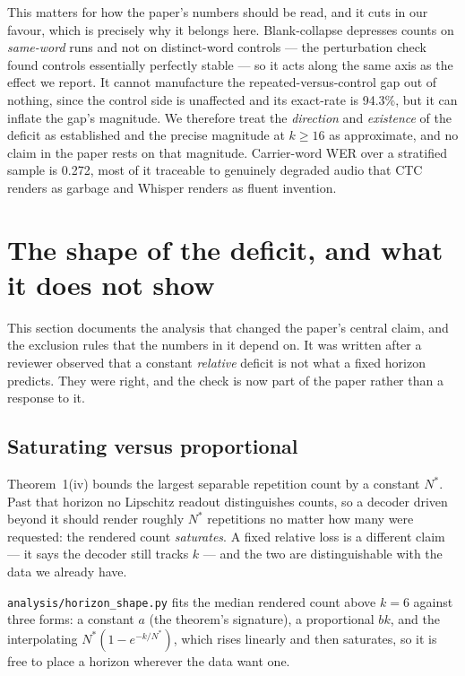 \documentclass[11pt]{article}
\begin{document}
This matters for how the paper's numbers should be read, and it cuts in our
favour, which is precisely why it belongs here. Blank-collapse depresses counts
on \emph{same-word} runs and not on distinct-word controls --- the perturbation
check found controls essentially perfectly stable --- so it acts along the same
axis as the effect we report. It cannot manufacture the repeated-versus-control
gap out of nothing, since the control side is unaffected and its exact-rate is
94.3\%, but it can inflate the gap's magnitude. We therefore treat the
\emph{direction} and \emph{existence} of the deficit as established and the
precise magnitude at $k\ge16$ as approximate, and no claim in the paper rests on
that magnitude. Carrier-word WER over a stratified sample is 0.272, most of it
traceable to genuinely degraded audio that CTC renders as garbage and Whisper
renders as fluent invention.


\section{The shape of the deficit, and what it does not show}
\label{sec:s10}

This section documents the analysis that changed the paper's central claim, and
the exclusion rules that the numbers in it depend on. It was written after a
reviewer observed that a constant \emph{relative} deficit is not what a fixed
horizon predicts. They were right, and the check is now part of the paper rather
than a response to it.

\subsection{Saturating versus proportional}

Theorem~1(iv) bounds the largest separable repetition count by a constant
$N^\ast$. Past that horizon no Lipschitz readout distinguishes counts, so a
decoder driven beyond it should render roughly $N^\ast$ repetitions no matter how
many were requested: the rendered count \emph{saturates}. A fixed relative loss
is a different claim --- it says the decoder still tracks $k$ --- and the two are
distinguishable with the data we already have.

\texttt{analysis/horizon\_shape.py} fits the median rendered count above
$k\!=\!6$ against three forms: a constant $a$ (the theorem's signature), a
proportional $bk$, and the interpolating
$N^\ast(1-e^{-k/N^\ast})$, which rises linearly and then saturates, so it is free
to place a horizon wherever the data want one.
\end{document}
